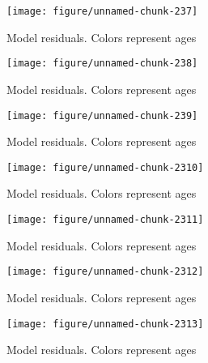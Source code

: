 \documentclass[a4paper]{article}\usepackage{graphicx, color}
\makeatletter
\def\maxwidth{ %
  \ifdim\Gin@nat@width>\linewidth
    \linewidth
  \else
    \Gin@nat@width
  \fi
}
\newenvironment{knitrout}{}{} %
\makeatother
\begin{document}
\begin{knitrout}
\begin{figure}[H]
{\centering \texttt{[image: figure/unnamed-chunk-237]} 

}

\caption[Model residuals]{Model residuals. Colors represent ages\label{fig:unnamed-chunk-237}}
\end{figure}
\begin{figure}[H]


{\centering \texttt{[image: figure/unnamed-chunk-238]} 

}

\caption[Model residuals]{Model residuals. Colors represent ages\label{fig:unnamed-chunk-238}}
\end{figure}
\begin{figure}[H]


{\centering \texttt{[image: figure/unnamed-chunk-239]} 

}

\caption[Model residuals]{Model residuals. Colors represent ages\label{fig:unnamed-chunk-239}}
\end{figure}
\begin{figure}[H]


{\centering \texttt{[image: figure/unnamed-chunk-2310]} 

}

\caption[Model residuals]{Model residuals. Colors represent ages\label{fig:unnamed-chunk-2310}}
\end{figure}
\begin{figure}[H]


{\centering \texttt{[image: figure/unnamed-chunk-2311]} 

}

\caption[Model residuals]{Model residuals. Colors represent ages\label{fig:unnamed-chunk-2311}}
\end{figure}
\begin{figure}[H]


{\centering \texttt{[image: figure/unnamed-chunk-2312]} 

}

\caption[Model residuals]{Model residuals. Colors represent ages\label{fig:unnamed-chunk-2312}}
\end{figure}
\begin{figure}[H]


{\centering \texttt{[image: figure/unnamed-chunk-2313]} 

}

\caption[Model residuals]{Model residuals. Colors represent ages\label{fig:unnamed-chunk-2313}}
\end{figure}
\begin{figure}[H]



\end{figure}
\end{knitrout}
\end{document}
